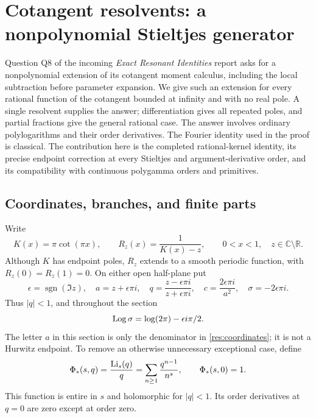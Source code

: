 \section{Cotangent resolvents: a nonpolynomial Stieltjes generator}
\label{res:section}

Question Q8 of the incoming \emph{Exact Resonant Identities} report
\cite{ghp:ExactResonant} asks for a nonpolynomial extension of its
cotangent moment calculus, including the local subtraction before
parameter expansion. We give such an extension for every rational
function of the cotangent bounded at infinity and with no real pole. A single
resolvent supplies the answer; differentiation gives all repeated
poles, and partial fractions give the general rational case. The
answer involves ordinary polylogarithms and their order derivatives.
The Fourier identity used in the proof is classical. The contribution
here is the completed rational-kernel identity, its precise endpoint
correction at every Stieltjes and argument-derivative order, and its
compatibility with continuous polygamma orders and primitives.

\subsection{Coordinates, branches, and finite parts}

Write
\begin{equation}\label{res:kernel}
 K(x)=\pi\cot(\pi x),\qquad
 R_z(x)=\frac1{K(x)-z},\qquad 0<x<1,\quad z\in\mathbb C\setminus\mathbb R.
\end{equation}
Although $K$ has endpoint poles, $R_z$ extends to a smooth periodic
function, with $R_z(0)=R_z(1)=0$. On either open half-plane put
\begin{equation}\label{res:coordinates}
 \epsilon=\operatorname{sgn}(\Im z),\quad
 a=z+\epsilon\pi i,\quad
 q=\frac{z-\epsilon\pi i}{z+\epsilon\pi i},\quad
 c=\frac{2\epsilon\pi i}{a^2},\quad
 \sigma=-2\epsilon\pi i.
\end{equation}
Thus $|q|<1$, and throughout the section
\[
 \operatorname{Log}\sigma=\log(2\pi)-\epsilon i\pi/2.
\]
The letter $a$ in this section is only the denominator in
\eqref{res:coordinates}; it is not a Hurwitz endpoint.
To remove an otherwise unnecessary exceptional case, define
\begin{equation}\label{res:normalizedpolylog}
 \Phi_*(s,q)=\frac{\operatorname{Li}_s(q)}q
       =\sum_{n\ge1}\frac{q^{n-1}}{n^s},\qquad
 \Phi_*(s,0)=1.
\end{equation}
This function is entire in $s$ and holomorphic for $|q|<1$.
Its order derivatives at $q=0$ are zero except at order zero.


